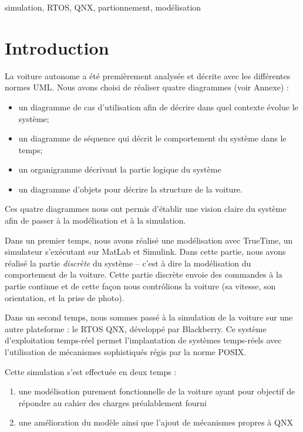 \documentclass[conference]{IEEEtran}
\begin{document}
\begin{IEEEkeywords}
simulation, RTOS, QNX, partion\-nement, modé\-lisation
\end{IEEEkeywords}


\section{Introduction}

La voiture autonome a été premièrement analysée et décrite avec les différentes normes UML. Nous avons choisi de réaliser quatre diagrammes (voir Annexe) :
\begin{itemize}
    \item un diagramme de cas d'utilisation afin de décrire dans quel contexte évolue le système;
    \item un diagramme de séquence qui décrit le comportement du système dans le temps;
    \item un organigramme décrivant la partie logique du système \item un diagramme d'objets pour décrire la structure de la voiture.
\end{itemize}{}
 
Ces quatre diagrammes nous ont permis d'établir une vision claire du système afin de passer à la modélisation et à la simulation.

Dans un premier temps, nous avons réalisé une modélisation avec TrueTime, un simulateur s'exécutant sur MatLab et Simulink. Dans cette partie, nous avons réalisé la partie \emph{discrète} du système -- c'est à dire la modélisation du comportement de la voiture. Cette partie discrète envoie des commandes à la partie continue et de cette façon nous contrôlions la voiture (sa vitesse, son orientation, et la prise de photo).

Dans un second temps, nous sommes passé à la simulation de la voiture sur une autre plateforme : le RTOS QNX, développé par Blackberry. Ce système d'exploitation temps-réel permet l'implantation de systèmes temps-réels avec l'utilisation de mécanismes sophistiqués régis par la norme POSIX.

Cette simulation s'est effectuée en deux temps :
\begin{enumerate}
    \item une modélisation purement fonctionnelle de la voiture ayant pour objectif de répondre au cahier des charges préalablement fourni
    \item une amélioration du modèle ainsi que l'ajout de méca\-nismes propres à QNX
\end{enumerate}
\end{document}
